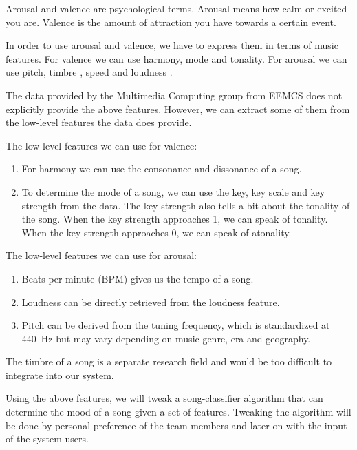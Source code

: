 Arousal and valence are psychological terms\cite{Thayer}.
Arousal means how calm or excited you are.
Valence is the amount of attraction you have towards a certain event.

In order to use arousal and valence, we have to express them in terms of music features.
For valence we can use harmony, mode and tonality\cite{DianaDeutsch}.
For arousal we can use pitch, timbre \cite{Liu03automaticmood}, speed and loudness \cite{PresentationMER}\cite{PaperME}.

\newpage

The data provided by the Multimedia Computing group from EEMCS does not explicitly provide the above features.
However, we can extract some of them from the low-level features the data does provide.

The low-level features we can use for valence:
\begin{enumerate}
\item For harmony we can use the consonance and dissonance of a song.
\item To determine the mode of a song, we can use the key, key scale and key strength from the data.
The key strength also tells a bit about the tonality of the song.
When the key strength approaches 1, we can speak of tonality. When the key strength approaches 0, we can speak of atonality.
\end{enumerate}
The low-level features we can use for arousal:
\begin{enumerate}
\item Beats-per-minute (BPM) gives us the tempo of a song.
\item Loudness can be directly retrieved from the loudness feature.
\item Pitch can be derived from the tuning frequency, which is standardized at \SI{440}{\hertz} but may vary depending on music genre, era and geography.
\end{enumerate}

The timbre of a song is a separate research field and would be too difficult to integrate into our system.

Using the above features, we will tweak a song-classifier algorithm that can determine the mood of a song given a set of features.
Tweaking the algorithm will be done by personal preference of the team members and later on with the input of the system users.